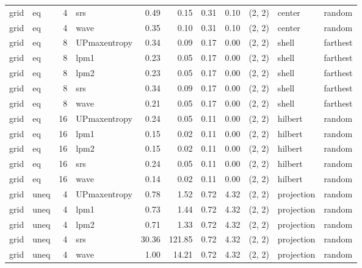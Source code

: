 \begin{tabular}{llrlrrrrlll}
  grid &    eq &  4 &          srs &  0.49 &     0.15 &   0.31 &       0.10 & (2, 2) &      center &     random \\
  grid &    eq &  4 &         wave &  0.35 &     0.10 &   0.31 &       0.10 & (2, 2) &      center &     random \\
  grid &    eq &  8 & UPmaxentropy &  0.34 &     0.09 &   0.17 &       0.00 & (2, 2) &       shell &   farthest \\
  grid &    eq &  8 &         lpm1 &  0.23 &     0.05 &   0.17 &       0.00 & (2, 2) &       shell &   farthest \\
  grid &    eq &  8 &         lpm2 &  0.23 &     0.05 &   0.17 &       0.00 & (2, 2) &       shell &   farthest \\
  grid &    eq &  8 &          srs &  0.34 &     0.09 &   0.17 &       0.00 & (2, 2) &       shell &   farthest \\
  grid &    eq &  8 &         wave &  0.21 &     0.05 &   0.17 &       0.00 & (2, 2) &       shell &   farthest \\
  grid &    eq & 16 & UPmaxentropy &  0.24 &     0.05 &   0.11 &       0.00 & (2, 2) &     hilbert &     random \\
  grid &    eq & 16 &         lpm1 &  0.15 &     0.02 &   0.11 &       0.00 & (2, 2) &     hilbert &     random \\
  grid &    eq & 16 &         lpm2 &  0.15 &     0.02 &   0.11 &       0.00 & (2, 2) &     hilbert &     random \\
  grid &    eq & 16 &          srs &  0.24 &     0.05 &   0.11 &       0.00 & (2, 2) &     hilbert &     random \\
  grid &    eq & 16 &         wave &  0.14 &     0.02 &   0.11 &       0.00 & (2, 2) &     hilbert &     random \\
  grid &  uneq &  4 & UPmaxentropy &  0.78 &     1.52 &   0.72 &       4.32 & (2, 2) &  projection &     random \\
  grid &  uneq &  4 &         lpm1 &  0.73 &     1.44 &   0.72 &       4.32 & (2, 2) &  projection &     random \\
  grid &  uneq &  4 &         lpm2 &  0.71 &     1.33 &   0.72 &       4.32 & (2, 2) &  projection &     random \\
  grid &  uneq &  4 &          srs & 30.36 &   121.85 &   0.72 &       4.32 & (2, 2) &  projection &     random \\
  grid &  uneq &  4 &         wave &  1.00 &    14.21 &   0.72 &       4.32 & (2, 2) &  projection &     random \\

\end{tabular}
